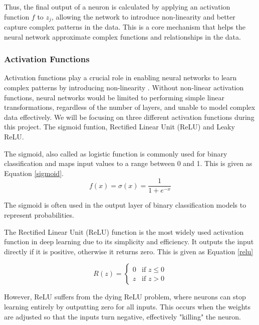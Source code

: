 \documentclass{article}
\newcommand{\0}{\mathbf{0}}
\newcommand{\1}{\mathbf{1}}
\begin{document}
Thus, the final output of a neuron is calculated by applying an activation function \( f \) to \( z_j \), allowing the network to introduce non-linearity and better capture complex patterns in the data. This is a core mechanism that helps the neural network approximate complex functions and relationships in the data.






\subsubsection{Activation Functions}

Activation functions play a crucial role in enabling neural networks to learn complex patterns by introducing non-linearity \cite{neuralnetworks_MH}. Without non-linear activation functions, neural networks would be limited to performing simple linear transformations, regardless of the number of layers, and unable to model complex data effectively.
We will be focusing on three different activation functions during this project. The sigmoid funtion, Rectified Linear Unit (ReLU) and Leaky ReLU. 

The sigmoid, also called as logistic function is commonly used for binary classification and maps input values to a range between 0 and 1. This is given as Equation \ref{sigmoid}. 
    \begin{equation}
        f(x) = \sigma(x) = \frac{1}{1 + e^{-x}}
        \label{sigmoid}
    \end{equation}

The sigmoid is often used in the output layer of binary classification models to represent probabilities.

The Rectified Linear Unit (ReLU) function is the most widely used activation function in deep learning due to its simplicity and efficiency. It outputs the input directly if it is positive, otherwise it returns zero. This is given as Equation \ref{relu}

\begin{equation}
    R(z) = 
    \begin{cases} 
      0 & \text{if } z \leq 0 \\
      z & \text{if } z > 0 
      \label{relu}
   \end{cases}
\end{equation}


However, ReLU suffers from the dying ReLU problem, where neurons can stop learning entirely by outputting zero for all inputs. This occurs when the weights are adjusted so that the inputs turn negative, effectively "killing" the neuron.
\end{document}
